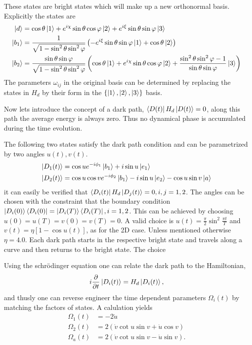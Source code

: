 These states are bright states which will make up a new orthonormal basis.
Explicitly the states are
\begin{equation}
\label{eq:states}
\begin{aligned}
\ket{d} &= \cos\theta\ket{1} + e^{i\chi}\sin\theta\cos\varphi\ket{2} + e^{i\xi}\sin\theta\sin\varphi\ket{3}
\\
\ket{b_1} &= \frac{1}{\sqrt{1-\sin^2\theta\sin^2\varphi}} \left(-e^{i\xi}\sin\theta\sin\varphi\ket{1} + \cos\theta\ket{2} \right)
\\
\ket{b_2} &= \frac{\sin\theta\sin\varphi}{\sqrt{1-\sin^2\theta\sin^2\varphi}} \left(\cos\theta\ket{1} + e^{i\chi}\sin\theta\cos\varphi\ket{2} + \frac{\sin^2\theta\sin^2\varphi - 1}{\sin\theta\sin\varphi} \ket{3}\right)
\end{aligned}
\end{equation}
The parameters $\omega_{ij}$ in the original basis can be determined by replacing the states in $H_d$ by their form in the $\{\ket{1},\ket{2},\ket{3}\}$ basis.

Now lets introduce the concept of a dark path, $\bra{D(t)}H_d\ket{D(t)} = 0$, along this path the average energy is always zero. Thus no dynamical phase is accumulated during the time evolution.

The following two states satisfy the dark path condition and can be parametrized by two angles $u(t), v(t)$.
\begin{equation}
\label{eq:dpaths}
\begin{aligned}
\ket{D_1(t)} &= \cos u e^{-i\phi_1}\ket{b_1} + i\sin u \ket{e_1}
\\
\ket{D_2(t)} &= \cos u\cos v e^{-i\phi_2}\ket{b_1} - i\sin u \ket{e_2} - \cos u\sin v \ket{a}
\end{aligned}
\end{equation}
it can easily be verified that $\bra{D_i(t)}H_d\ket{D_j(t)} = 0, i,j = 1,2$. The angles can be chosen with the constraint that the boundary condition $\ket{D_i(0)}\bra{D_i(0)} = \ket{D_i(T)}\bra{D_i(T)}, i = 1,2$. This can be achieved by choosing $u(0) = u(T) = v(0) = v(T) = 0$. A valid choice is $u(t) = \frac{\pi}{2}\sin^2\frac{\pi t}{T}$ and $v(t) = \eta\left[1 - \cos u(t)\right]$, as for the 2D case. Unless mentioned otherwise $\eta = 4.0$. Each dark path starts in the respective bright state and travels along a curve and then returns to the bright state. The choice 

Using the schrödinger equation one can relate the dark path to the Hamiltonian,
\begin{equation}
i\pdv{}{t}\ket{D_i(t)} = H_d\ket{D_i(t)},
\end{equation}
and thusly one can reverse engineer the time dependent parameters $\Omega_i(t)$ by matching the factors of states. A calulation yields 
\begin{equation}
\begin{aligned}
\Omega_1(t) &= -2\dot{u}
\\ 
\Omega_2(t) &= 2\left(\dot{v}\cot u\sin v + \dot{u}\cos v \right)
\\
\Omega_a(t) &= 2\left(\dot{v}\cot u\sin v - \dot{u}\sin v \right).
\end{aligned}
\end{equation}

